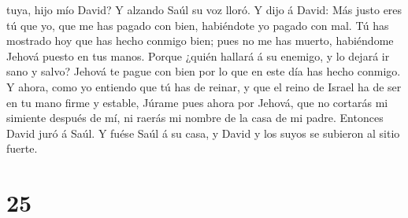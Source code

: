 tuya, hijo mío David? Y alzando Saúl su voz lloró.  Y dijo
á David: Más justo eres tú que yo, que me has pagado con bien,
habiéndote yo pagado con mal.  Tú has mostrado hoy que has
hecho conmigo bien; pues no me has muerto, habiéndome Jehová puesto en
tus manos.  Porque ¿quién hallará á su enemigo, y lo dejará
ir sano y salvo? Jehová te pague con bien por lo que en este día has
hecho conmigo.  Y ahora, como yo entiendo que tú has de
reinar, y que el reino de Israel ha de ser en tu mano firme y estable,
 Júrame pues ahora por Jehová, que no cortarás mi simiente
después de mí, ni raerás mi nombre de la casa de mi padre. Entonces
David juró á Saúl. Y fuése Saúl á su casa, y David y los suyos se
subieron al sitio fuerte.

\hypertarget{section-24}{%
\section{25}\label{section-24}}

